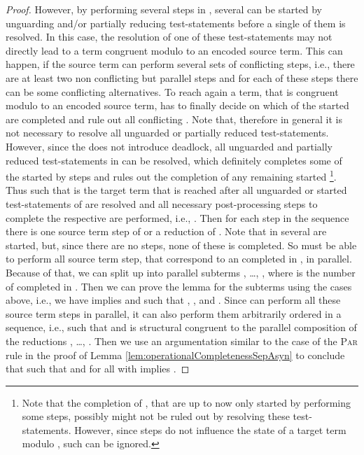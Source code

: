 \documentclass[]{llncs}
\begin{document}
\begin{proof}
	However, by performing several \impure \admin steps in , several \simulations can be started by unguarding and/or partially reducing test-statements before a single of them is resolved. In this case, the resolution of one of these test-statements may not directly lead to a term congruent modulo  to an encoded source term. This can happen, if the source term can perform several sets of conflicting steps, i.e., there are at least two non conflicting but parallel steps and for each of these steps there can be some conflicting alternatives. To reach again a term, that is congruent modulo  to an encoded source term,  has to finally decide on which of the started \simulations are completed and rule out all conflicting \simulations. Note that, therefore in general it is not necessary to resolve all unguarded or partially reduced test-statements. However, since the  does not introduce deadlock, all unguarded and partially reduced test-statements in  can be resolved, which definitely completes some of the started \simulations by \nonAdmin steps and rules out the completion of any remaining started \simulation\footnote{Note that the completion of \simulations, that are up to now only started by performing some \pure \admin steps, possibly might not be ruled out by resolving these test-statements. However, since \pure \admin steps do not influence the state of a target term modulo , such \simulations can be ignored.}. Thus  such that  is the target term that is reached after all unguarded or started test-statements of  are resolved and all necessary post-processing steps to complete the respective \simulations are performed, i.e., . Then for each \nonAdmin step in the sequence  there is one source term step of  or a reduction of . Note that in  several \simulations are started, but, since there are no \nonAdmin steps, none of these \simulations is completed. So  must be able to perform all source term step, that correspond to an \simulation completed in , in parallel. Because of that, we can split up  into  parallel subterms , \ldots, , where  is the number of \simulations completed in . Then we can prove the lemma for the subterms using the cases above, i.e., we have  implies  and  such that , , and . Since  can perform all these source term steps in parallel, it can also perform them arbitrarily ordered in a sequence, i.e.,  such that  and  is structural congruent to the parallel composition of the reductions , \ldots, . Then we use an argumentation similar to the case of the \textsc{Par} rule in the proof of Lemma \ref{lem:operationalCompletenessSepAsyn} to conclude that  such that  and  for all  with  implies .
	

\end{proof}
\end{document}
